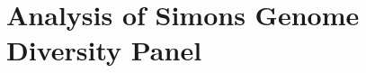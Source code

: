 \documentclass{article}
\begin{document}


\newpage
\setcounter{section}{0}
\renewcommand{\thesection}{S\arabic{section}}%
\setcounter{table}{0}
\renewcommand{\thetable}{S\arabic{table}}%
\setcounter{figure}{0}
\renewcommand{\thefigure}{S\arabic{figure}}%

\section{Analysis of Simons Genome Diversity Panel}
\end{document}
